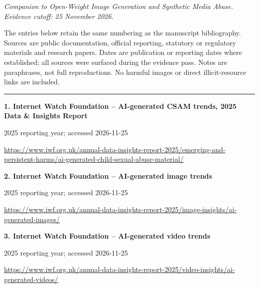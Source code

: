 \documentclass[11pt,a4paper]{article}
\begin{document}
\par\vspace{3mm}
\textit{Companion to Open-Weight Image Generation and Synthetic Media Abuse. Evidence cutoff: 25 November 2026.}\par
The entries below retain the same numbering as the manuscript bibliography. Sources are public documentation, official reporting, statutory or regulatory materials and research papers. Dates are publication or reporting dates where established; all sources were surfaced during the evidence pass. Notes are paraphrases, not full reproductions. No harmful images or direct illicit-resource links are included.\par\hrule\vspace{3mm}
\noindent\begin{minipage}{\linewidth}\textbf{1. Internet Watch Foundation -- AI-generated CSAM trends, 2025 Data \& Insights Report}\par{\small 2025 reporting year; accessed 2026-11-25\par\url{https://www.iwf.org.uk/annual-data-insights-report-2025/emerging-and-persistent-harms/ai-generated-child-sexual-abuse-material/}}\par
\end{minipage}\par\vspace{2mm}
\noindent\begin{minipage}{\linewidth}\textbf{2. Internet Watch Foundation -- AI-generated image trends}\par{\small 2025 reporting year; accessed 2026-11-25\par\url{https://www.iwf.org.uk/annual-data-insights-report-2025/image-insights/ai-generated-images/}}\par
\end{minipage}\par\vspace{2mm}
\noindent\begin{minipage}{\linewidth}\textbf{3. Internet Watch Foundation -- AI-generated video trends}\par{\small 2025 reporting year; accessed 2026-11-25\par\url{https://www.iwf.org.uk/annual-data-insights-report-2025/video-insights/ai-generated-videos/}}\par
\end{minipage}\par\vspace{2mm}
\end{document}
